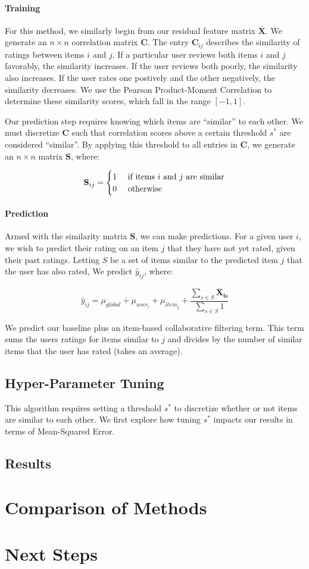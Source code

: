 \documentclass[12pt]{article}
\begin{document}
\paragraph{Training} For this method, we similarly begin from our residual feature matrix $\mathbf{\bar X}$. We generate an $n \times n$ correlation matrix $\mathbf{C}$. The entry $\mathbf{C}_{ij}$ describes the similarity of ratings between items $i$ and $j$. If a particular user reviews both items $i$ and $j$ favorably, the similarity increases. If the user reviews both poorly, the similarity also increases. If the user rates one postively and the other negatively, the similarity decreases. We use the Pearson Product-Moment Correlation to determine these similarity scores, which fall in the range $[-1, 1]$.

Our prediction step requires knowing which items are ``similar'' to each other. We must discretize $\mathbf{C}$ such that correlation scores above a certain threshold $s^*$ are considered ``similar''. By applying this threshold to all entries in $\mathbf{C}$, we generate an $n \times n$ matrix $\mathbf{S}$, where:

$$
\mathbf{S}_{ij} =
\begin{cases}
    \hfill 1    \hfill & \text{ if items $i$ and $j$ are similar} \\
    \hfill 0    \hfill & \text{ otherwise} \\
\end{cases}
$$

\paragraph{Prediction} Armed with the similarity matrix $\mathbf{S}$, we can make predictions. For a given user $i$, we wish to predict their rating on an item $j$ that they have not yet rated, given their past ratings. Letting $S$ be a set of items similar to the predicted item $j$ that the user has also rated, We predict $\hat y_{ij}$, where:

$$ \hat y_{ij} = \mu_{global} + \mu_{user_i} + \mu_{item_j} + \frac{\sum_{s \in S} \mathbf{\bar X_{is}}}{\sum_{s \in S} 1 }$$

We predict our baseline plus an item-based collaborative filtering term. This term sums the users ratings for items similar to $j$ and divides by the number of similar items that the user has rated (takes an average).

\subsection{Hyper-Parameter Tuning}
This algorithm requires setting a threshold $s^*$ to discretize whether or not items are similar to each other. We first explore how tuning $s^*$ impacts our results in terms of Mean-Squared Error.

\subsection{Results}

\section{Comparison of Methods}

\section{Next Steps}
\end{document}
